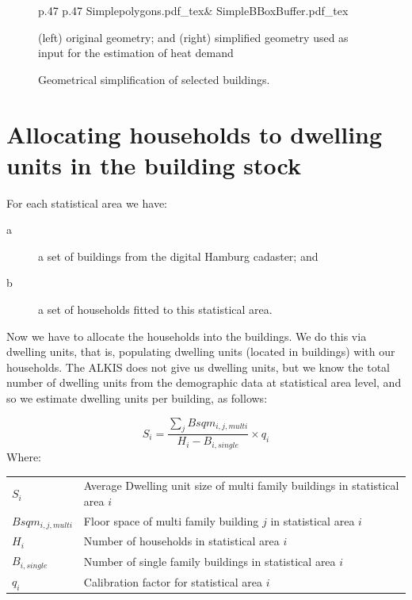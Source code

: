 \documentclass[11pt]{IJM-article}
\begin{document}
\begin{figure}[htb]
    \centering 
    \caption{Geometrical simplification of selected buildings.} 
    \label{fig:5} 
    \vspace{1em}
    \begin{tabular}{p{.47\textwidth} p{.47\textwidth}} 
        \def\svgwidth{\linewidth}
        {Simplepolygons.pdf_tex}& 
        \def\svgwidth{\linewidth}
        {SimpleBBoxBuffer.pdf_tex} 
    \end{tabular} 
    \begin{flushleft}
    \begin{footnotesize}
    (left) original geometry; and (right) simplified geometry used as input for
    the estimation of heat demand
    \end{footnotesize}
    \end{flushleft}
\end{figure}

\section{Allocating households to dwelling units in the building stock}
\label{sec:7}

For each statistical area we have:\\
\begin{description}
    \item[a] a set of buildings from the digital Hamburg cadaster; and
    \item[b] a set of households fitted to this statistical area.
\end{description}\pb

Now we have to allocate the households into the buildings. We do this via
dwelling units, that is, populating dwelling units (located in buildings) with
our households. The ALKIS does not give us dwelling units, but we know the
total number of dwelling units from the demographic data at statistical area
level, and so we estimate dwelling units per building, as follows:\\

\parbox{\textwidth}{ 
    \begin{equation} 
    \label{eq:4} 
        S_{i} = \frac{\sum_{j}Bsqm_{i,j,multi}}{H_{i} - B_{i,single}} 
            \times q_{i}
    \end{equation} 
    \noindent Where:\\ 
    \vspace{.5cm}
    \begin{tabular}{l l} 
        $S_{i}$ & Average Dwelling unit size of multi family buildings in 
            statistical area $i$\\ 
        $Bsqm_{i,j,multi}$ & Floor space of multi family building ${j}$ in 
            statistical area $i$\\ 
        $H_{i}$ & Number of households in statistical area ${i}$\\ 
        $B_{i,single}$ & Number of single family buildings in statistical 
            area $i$\\ 
        $q_i$ & Calibration factor for statistical area $i$
    \end{tabular} 
}\pb
\end{document}

